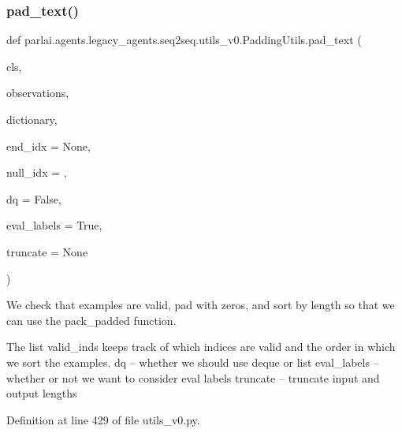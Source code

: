 \mbox{\label{classparlai_1_1agents_1_1legacy__agents_1_1seq2seq_1_1utils__v0_1_1PaddingUtils_ae7f9ca3d9fd7dd823895a28af6cae34f}} 
\subsubsection{\texorpdfstring{pad\+\_\+text()}{pad\_text()}}
{\footnotesize\ttfamily def parlai.\+agents.\+legacy\+\_\+agents.\+seq2seq.\+utils\+\_\+v0.\+Padding\+Utils.\+pad\+\_\+text (\begin{DoxyParamCaption}\item[{}]{cls,  }\item[{}]{observations,  }\item[{}]{dictionary,  }\item[{}]{end\+\_\+idx = {\ttfamily None},  }\item[{}]{null\+\_\+idx = {},  }\item[{}]{dq = {\ttfamily False},  }\item[{}]{eval\+\_\+labels = {\ttfamily True},  }\item[{}]{truncate = {\ttfamily None} }\end{DoxyParamCaption})}

\begin{DoxyVerb}We check that examples are valid, pad with zeros, and sort by length so that we
can use the pack_padded function.

The list valid_inds
keeps track of which indices are valid and the order in which we sort
the examples.
dq -- whether we should use deque or list
eval_labels -- whether or not we want to consider eval labels
truncate -- truncate input and output lengths
\end{DoxyVerb}
 

Definition at line 429 of file utils\+\_\+v0.\+py.


